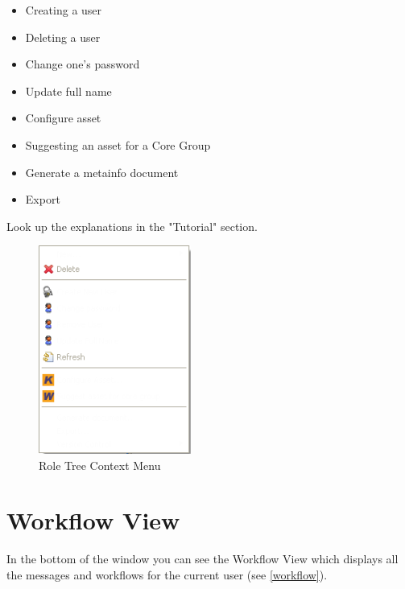 \begin{itemize}
	\item Creating a user
	\item Deleting a user
	\item Change one's password
	\item Update full name
	\item Configure asset
	\item Suggesting an asset for a Core Group
	\item Generate a metainfo document
	\item Export
\end{itemize}
Look up the explanations in the "Tutorial" section.

\begin{figure}[h!]
\begin{center}
\includegraphics[width=5cm]{rolekontext.png}
   \caption{Role Tree Context Menu}
\label{rolekontext}
\end{center}
\end{figure}\par



\section{Workflow View}

In the bottom of the window you can see the Workflow View which displays all 
the messages and workflows for the current user (see \ref{workflow}). 

